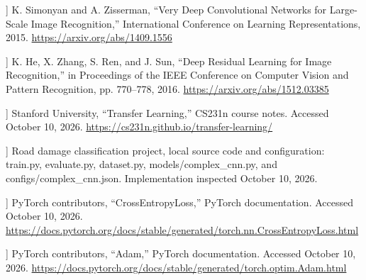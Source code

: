 \begin{list}{}{\setlength{\leftmargin}{2.5em}\setlength{\labelwidth}{2em}\setlength{\labelsep}{0.5em}\setlength{\itemsep}{0.5em}}
\item[[9]] K. Simonyan and A. Zisserman, ``Very Deep Convolutional Networks for Large-Scale Image Recognition,'' International Conference on Learning Representations, 2015.
\url{https://arxiv.org/abs/1409.1556}

\item[[10]] K. He, X. Zhang, S. Ren, and J. Sun, ``Deep Residual Learning for Image Recognition,'' in Proceedings of the IEEE Conference on Computer Vision and Pattern Recognition, pp. 770--778, 2016.
\url{https://arxiv.org/abs/1512.03385}

\item[[11]] Stanford University, ``Transfer Learning,'' CS231n course notes. Accessed October 10, 2026.
\url{https://cs231n.github.io/transfer-learning/}

\item[[12]] Road damage classification project, local source code and configuration: train.py, evaluate.py, dataset.py, models/complex\_cnn.py, and configs/complex\_cnn.json. Implementation inspected October 10, 2026.

\item[[13]] PyTorch contributors, ``CrossEntropyLoss,'' PyTorch documentation. Accessed October 10, 2026.
\url{https://docs.pytorch.org/docs/stable/generated/torch.nn.CrossEntropyLoss.html}

\item[[14]] PyTorch contributors, ``Adam,'' PyTorch documentation. Accessed October 10, 2026.
\url{https://docs.pytorch.org/docs/stable/generated/torch.optim.Adam.html}

\end{list}

\endgroup
